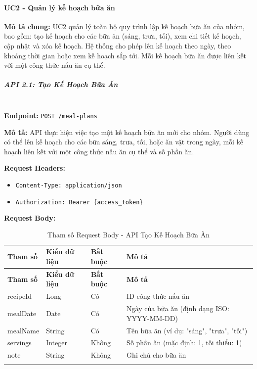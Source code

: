 \paragraph{UC2 - Quản lý kế hoạch bữa ăn}

\textbf{Mô tả chung:} UC2 quản lý toàn bộ quy trình lập kế hoạch bữa ăn của nhóm, bao gồm: tạo kế hoạch cho các bữa ăn (sáng, trưa, tối), xem chi tiết kế hoạch, cập nhật và xóa kế hoạch. Hệ thống cho phép lên kế hoạch theo ngày, theo khoảng thời gian hoặc xem kế hoạch sắp tới. Mỗi kế hoạch bữa ăn được liên kết với một công thức nấu ăn cụ thể.

\subparagraph{API 2.1: Tạo Kế Hoạch Bữa Ăn}~\\

\textbf{Endpoint:} \texttt{POST /meal-plans}

\textbf{Mô tả:} API thực hiện việc tạo một kế hoạch bữa ăn mới cho nhóm. Người dùng có thể lên kế hoạch cho các bữa sáng, trưa, tối, hoặc ăn vặt trong ngày, mỗi kế hoạch liên kết với một công thức nấu ăn cụ thể và số phần ăn.

\textbf{Request Headers:}
\begin{itemize}
    \item \texttt{Content-Type: application/json}
    \item \texttt{Authorization: Bearer \{access\_token\}}
\end{itemize}

\textbf{Request Body:}

\small
\begin{longtable}{|>{\raggedright\arraybackslash}p{3.5cm}|>{\raggedright\arraybackslash}p{2.5cm}|>{\raggedright\arraybackslash}p{2cm}|>{\raggedright\arraybackslash}p{5.5cm}|}
\hline
\textbf{Tham số} & \textbf{Kiểu dữ liệu} & \textbf{Bắt buộc} & \textbf{Mô tả} \\
\hline
\endfirsthead
\hline
\textbf{Tham số} & \textbf{Kiểu dữ liệu} & \textbf{Bắt buộc} & \textbf{Mô tả} \\
\hline
\endhead
recipeId & Long & Có & ID công thức nấu ăn \\
\hline
mealDate & Date & Có & Ngày của bữa ăn (định dạng ISO: YYYY-MM-DD) \\
\hline
mealName & String & Có & Tên bữa ăn (ví dụ: "sáng", "trưa", "tối") \\
\hline
servings & Integer & Không & Số phần ăn (mặc định: 1, tối thiểu: 1) \\
\hline
note & String & Không & Ghi chú cho bữa ăn \\
\hline
\caption{Tham số Request Body - API Tạo Kế Hoạch Bữa Ăn}
\end{longtable}

